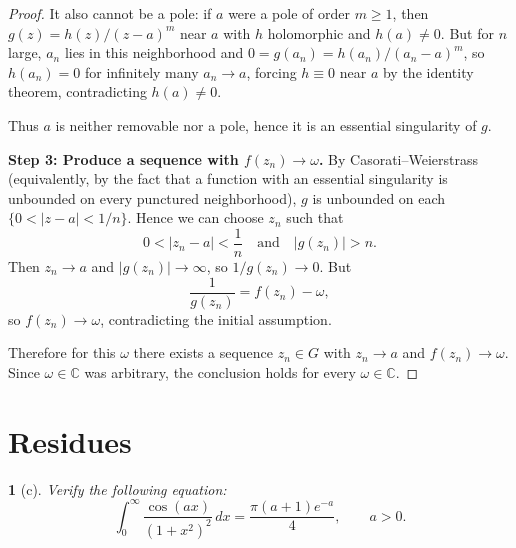 \documentclass[12pt, a4paper]{report}
\theoremstyle{spaced}
\newtheorem{exercise}{}
\newcommand{\setexercise}[1]{\setcounter{exercise}{#1-1}}
\begin{document}
\begin{proof}
	It also cannot be a pole: if $a$ were a pole of order $m\ge1$, then
	$g(z)=h(z)/(z-a)^m$ near $a$ with $h$ holomorphic and $h(a)\neq0$. But for $n$
	large, $a_n$ lies in this neighborhood and $0=g(a_n)=h(a_n)/(a_n-a)^m$, so
	$h(a_n)=0$ for infinitely many $a_n\to a$, forcing $h\equiv0$ near $a$ by the
	identity theorem, contradicting $h(a)\neq0$.

	Thus $a$ is neither removable nor a pole, hence it is an essential singularity
	of $g$.

	\medskip
	\noindent\textbf{Step 3: Produce a sequence with $f(z_n)\to\omega$.}
	By Casorati--Weierstrass (equivalently, by the fact that a function with an
	essential singularity is unbounded on every punctured neighborhood), $g$ is
	unbounded on each $\{0<|z-a|<1/n\}$. Hence we can choose $z_n$ such that
	\[
		0<|z_n-a|<\frac1n
		\quad\text{and}\quad
		|g(z_n)|>n.
	\]
	Then $z_n\to a$ and $|g(z_n)|\to\infty$, so $1/g(z_n)\to0$. But
	\[
		\frac1{g(z_n)} = f(z_n)-\omega,
	\]
	so $f(z_n)\to\omega$, contradicting the initial assumption.

	Therefore for this $\omega$ there exists a sequence $z_n\in G$ with $z_n\to a$
	and $f(z_n)\to\omega$. Since $\omega\in\mathbb C$ was arbitrary, the conclusion
	holds for every $\omega\in\mathbb C$.
\end{proof}


\section{Residues}

\setexercise{2}
\begin{exercise}[c]
	Verify the following equation:
	\[
		\int_{0}^{\infty} \frac{\cos(ax)}{(1+x^{2})^{2}}\, dx
		= \frac{\pi (a+1)e^{-a}}{4}, \qquad a>0.
	\]
\end{exercise}
\end{document}
